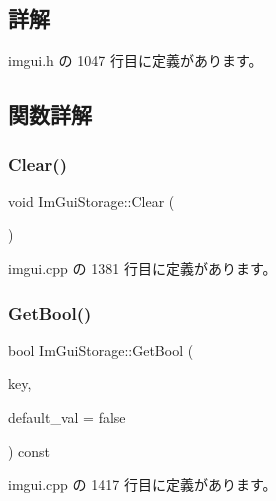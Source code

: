 \subsection{詳解}


 imgui.\+h の 1047 行目に定義があります。



\subsection{関数詳解}
\mbox{\label{struct_im_gui_storage_a72ceecfbca3d08df8c2a232b77890c20}} 
\subsubsection{\texorpdfstring{Clear()}{Clear()}}
{\footnotesize\ttfamily void Im\+Gui\+Storage\+::\+Clear (\begin{DoxyParamCaption}{ }\end{DoxyParamCaption})}



 imgui.\+cpp の 1381 行目に定義があります。

\mbox{\label{struct_im_gui_storage_a22d34ae6278f86468a3e7df8fbd1b632}} 
\subsubsection{\texorpdfstring{Get\+Bool()}{GetBool()}}
{\footnotesize\ttfamily bool Im\+Gui\+Storage\+::\+Get\+Bool (\begin{DoxyParamCaption}\item[{\mbox{\hyperlink{imgui_8h_a1785c9b6f4e16406764a85f32582236f}{Im\+Gui\+ID}}}]{key,  }\item[{bool}]{default\+\_\+val = {\ttfamily false} }\end{DoxyParamCaption}) const}



 imgui.\+cpp の 1417 行目に定義があります。

\mbox{\label{struct_im_gui_storage_aeb0d62100453d710bac5f6ad0a6e6a2e}} 
